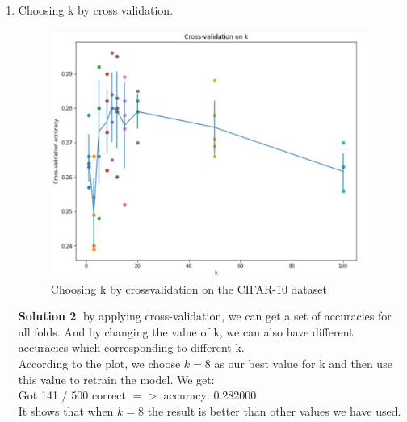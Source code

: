 \documentclass[]{book}
\theoremstyle{definition}
\newtheorem*{soln}{Solution}
\begin{document}
\begin{enumerate}
\begin{soln}
		The result is same compared to the former methods. We can compare how fast the implementations are. The result is that:\\
		Two loop version took 884.739000 seconds\\
		One loop version took 104.597000 seconds\\
		No loop version took 12.769000 seconds
	\end{soln}
	\item Choosing k by cross validation.
	\begin{figure}[h]
			\centering
			\includegraphics[width=11cm]{knn.jpg}
			\caption{Choosing k by crossvalidation on the CIFAR-10 dataset}
			\label{fig：1}
	\end{figure}
	\begin{soln}
		by applying cross-validation, we can get a set of accuracies for all folds. And by changing the value of k, we can also have different accuracies which corresponding to different k.\\
		According to the plot, we choose $k=8$ as our best value for k and then use this value to retrain the model. We get:\\
		Got 141 $/$ 500 correct $=>$ accuracy: 0.282000. \\It shows that when $k = 8 $ the result is better than other values we have used. 
	\end{soln}
\end{enumerate}
\end{document}
